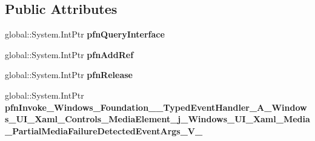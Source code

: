 \subsection*{Public Attributes}
\begin{DoxyCompactItemize}
\item 
\mbox{\label{struct_windows_1_1_foundation_1_1_typed_event_handler___a___windows___u_i___xaml___controls___meab68a8b38914bc3ba3e7f1414dd848fa_a573745347016a2c14274e260623b138d}} 
global\+::\+System.\+Int\+Ptr {\bfseries pfn\+Query\+Interface}
\item 
\mbox{\label{struct_windows_1_1_foundation_1_1_typed_event_handler___a___windows___u_i___xaml___controls___meab68a8b38914bc3ba3e7f1414dd848fa_af3dfadb6ac118f829b4ce26a5e073ccf}} 
global\+::\+System.\+Int\+Ptr {\bfseries pfn\+Add\+Ref}
\item 
\mbox{\label{struct_windows_1_1_foundation_1_1_typed_event_handler___a___windows___u_i___xaml___controls___meab68a8b38914bc3ba3e7f1414dd848fa_a2e0ac959ee92bf36513181d12199384b}} 
global\+::\+System.\+Int\+Ptr {\bfseries pfn\+Release}
\item 
\mbox{\label{struct_windows_1_1_foundation_1_1_typed_event_handler___a___windows___u_i___xaml___controls___meab68a8b38914bc3ba3e7f1414dd848fa_ae9a21b3eb63c18bc4c494261d4a61513}} 
global\+::\+System.\+Int\+Ptr {\bfseries pfn\+Invoke\+\_\+\+Windows\+\_\+\+Foundation\+\_\+\+\_\+\+Typed\+Event\+Handler\+\_\+\+A\+\_\+\+Windows\+\_\+\+U\+I\+\_\+\+Xaml\+\_\+\+Controls\+\_\+\+Media\+Element\+\_\+j\+\_\+\+Windows\+\_\+\+U\+I\+\_\+\+Xaml\+\_\+\+Media\+\_\+\+Partial\+Media\+Failure\+Detected\+Event\+Args\+\_\+\+V\+\_\+}
\end{DoxyCompactItemize}
